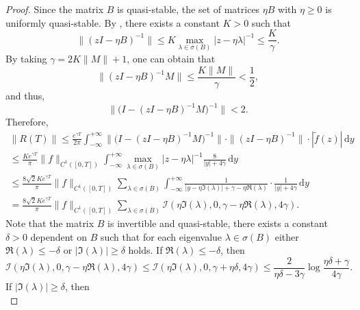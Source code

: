 \documentclass{article}
\theoremstyle{plain}%
\theoremstyle{definition}%
\theoremstyle{remark}%
\newcommand{\cI}{\mathcal{I}}
\newcommand{\rd}{\mathrm{d}}
\newcommand{\+}[1]{{\bm{#1}}}
\begin{document}
\begin{proof}
  Since the matrix $B$ is quasi-stable, the set of matrices $\eta B$ 
  with $\eta \ge 0$ is uniformly quasi-stable. By , 
  there exists a constant $K > 0$ such that 
  \begin{displaymath}
    \|(z I - \eta B)^{-1}\| \le K \max_{\lambda \in \sigma(B)} 
    |z - \eta \lambda|^{-1} \le \frac{K}{\gamma}.
  \end{displaymath}
  By taking $\gamma = 2 K \|M\| + 1$, one can obtain that 
  \begin{displaymath}
    \|(z I - \eta B)^{-1} M\| \le \frac{K \|M\|}{\gamma} < \frac12,
  \end{displaymath}
  and thus, 
  \begin{displaymath}
    \big\| \big( I - (z I - \eta B)^{-1} M \big)^{-1} \big\| < 2.
  \end{displaymath}
  Therefore, 
  \begin{multline*}
    \|R(T)\| \le \frac{e^{\gamma T}}{2 \pi} \int_{-\infty}^{+\infty}
    \big\| \big( I - (z I - \eta B)^{-1} M \big)^{-1} \big\| \cdot 
    \|(z I - \eta B)^{-1}\| \cdot |\tilde{f}(z)| \,\rd y \\ 
    \le \frac{K e^{\gamma T}}{\pi}
    \|f\|_{C^1([0, T])} \int_{-\infty}^{+\infty} 
    \max_{\lambda \in \sigma(B)} |z - \eta \lambda|^{-1}
    \frac{8}{|y| + 4 \gamma} \,\rd y \\ 
    \le \frac{8 \sqrt{2} K e^{\gamma T}}{\pi} 
    \|f\|_{C^1([0, T])} 
    \sum_{\lambda \in \sigma(B)} \int_{-\infty}^{+\infty} 
    \frac{1}{|y - \eta \Im(\lambda)| + \gamma - \eta \Re(\lambda)}
    \cdot \frac{1}{|y| + 4 \gamma} \,\rd y \\ 
    = \frac{8 \sqrt{2} K e^{\gamma T}}{\pi} 
    \|f\|_{C^1([0, T])} \sum_{\lambda \in \sigma(B)} 
    \cI(\eta \Im(\lambda), 0, \gamma - \eta \Re(\lambda), 4 \gamma).
  \end{multline*}
  Note that the matrix $B$ is invertible and quasi-stable, there 
  exists a constant $\delta > 0$ dependent on $B$ such that 
  for each eigenvalue $\lambda \in \sigma(B)$ either 
  $\Re(\lambda) \le - \delta$ or $|\Im(\lambda)| \ge \delta$ holds.
  If $\Re(\lambda) \le - \delta$, then 
  \begin{displaymath}
    \cI(\eta \Im(\lambda), 0, \gamma - \eta \Re(\lambda), 4 \gamma) 
    \le \cI(\eta \Im(\lambda), 0, \gamma + \eta \delta, 4 \gamma)
    \le \frac{2}{\eta \delta - 3 \gamma} \log 
    \frac{\eta \delta + \gamma}{4 \gamma}.
  \end{displaymath}
  If $|\Im(\lambda)| \ge \delta$, then 
  \begin{displaymath}

\end{displaymath}
\end{proof}
\end{document}
